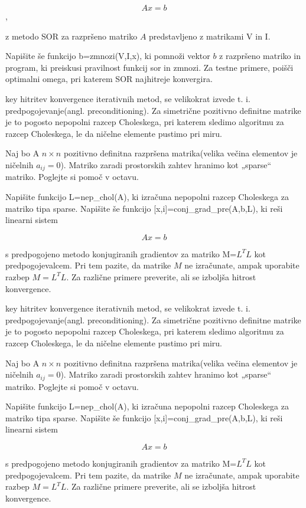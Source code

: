 \documentclass{article}
\begin{document}
\[Ax=b\],

z metodo SOR za razpršeno matriko \(A\) predstavljeno z matrikami V in I.

Napišite še funkcijo b=zmnozi(V,I,x), ki pomnoži vektor \(b\) z  razpršeno matriko in program, ki preiskusi pravilnost funkcij sor in zmnozi.
Za testne primere, poišči optimalni omega, pri katerem SOR najhitreje konvergira.

key
hitritev konvergence iterativnih metod, se velikokrat izvede t. i. predpogojevanje(angl. preconditioning). Za simetrične pozitivno definitne matrike je to pogosto nepopolni razcep Choleskega, pri katerem sledimo algoritmu za razcep Choleskega, le da ničelne elemente pustimo pri miru.

Naj bo A \(n\times n\) pozitivno definitna razpršena matrika(velika večina elementov je ničelnih \(a_{ij}=0\)). Matriko zaradi prostorskih zahtev hranimo kot „sparse“  matriko. Poglejte si pomoč v octavu.

Napišite funkcijo L=nep_chol(A), ki izračuna nepopolni razcep Choleskega za matriko tipa sparse. Napišite še funkcijo [x,i]=conj_grad_pre(A,b,L), ki reši linearni sistem

\[Ax=b\]

s predpogojeno metodo konjugiranih gradientov za matriko M=\(L^T L\) kot predpogojevalcem. Pri tem pazite, da matrike \(M\) ne izračunate, ampak uporabite razbep \(M=L^TL\). Za različne primere preverite, ali se izboljša hitrost konvergence.

key
hitritev konvergence iterativnih metod, se velikokrat izvede t. i. predpogojevanje(angl. preconditioning). Za simetrične pozitivno definitne matrike je to pogosto nepopolni razcep Choleskega, pri katerem sledimo algoritmu za razcep Choleskega, le da ničelne elemente pustimo pri miru.

Naj bo A \(n\times n\) pozitivno definitna razpršena matrika(velika večina elementov je ničelnih \(a_{ij}=0\)). Matriko zaradi prostorskih zahtev hranimo kot „sparse“  matriko. Poglejte si pomoč v octavu.

Napišite funkcijo L=nep_chol(A), ki izračuna nepopolni razcep Choleskega za matriko tipa sparse. Napišite še funkcijo [x,i]=conj_grad_pre(A,b,L), ki reši linearni sistem

\[Ax=b\]

s predpogojeno metodo konjugiranih gradientov za matriko M=\(L^T L\) kot predpogojevalcem. Pri tem pazite, da matrike \(M\) ne izračunate, ampak uporabite razbep \(M=L^TL\). Za različne primere preverite, ali se izboljša hitrost konvergence.
\end{document}
